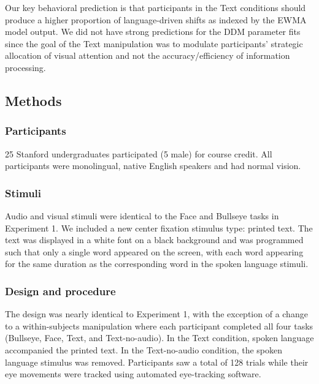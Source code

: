 \documentclass[english,floatsintext,man]{apa6}
\theoremstyle{definition}
\theoremstyle{definition}
\theoremstyle{definition}
\theoremstyle{remark}
\begin{document}
Our key behavioral prediction is that participants in the Text
conditions should produce a higher proportion of language-driven shifts
as indexed by the EWMA model output. We did not have strong predictions
for the DDM parameter fits since the goal of the Text manipulation was
to modulate participants' strategic allocation of visual attention and
not the accuracy/efficiency of information processing.

\hypertarget{methods-1}{%
\subsection{Methods}\label{methods-1}}

\hypertarget{participants-1}{%
\subsubsection{Participants}\label{participants-1}}

25 Stanford undergraduates participated (5 male) for course credit. All
participants were monolingual, native English speakers and had normal
vision.

\hypertarget{stimuli-1}{%
\subsubsection{Stimuli}\label{stimuli-1}}

Audio and visual stimuli were identical to the Face and Bullseye tasks
in Experiment 1. We included a new center fixation stimulus type:
printed text. The text was displayed in a white font on a black
background and was programmed such that only a single word appeared on
the screen, with each word appearing for the same duration as the
corresponding word in the spoken language stimuli.

\hypertarget{design-and-procedure-1}{%
\subsubsection{Design and procedure}\label{design-and-procedure-1}}

The design was nearly identical to Experiment 1, with the exception of a
change to a within-subjects manipulation where each participant
completed all four tasks (Bullseye, Face, Text, and Text-no-audio). In
the Text condition, spoken language accompanied the printed text. In the
Text-no-audio condition, the spoken language stimulus was removed.
Participants saw a total of 128 trials while their eye movements were
tracked using automated eye-tracking software.
\end{document}

